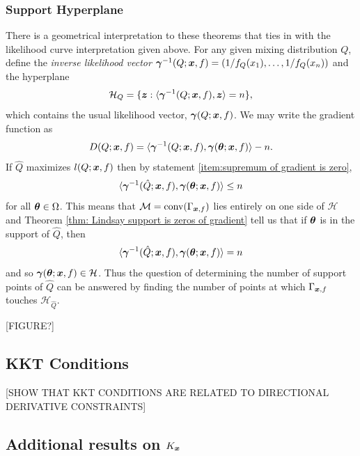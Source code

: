 	\subsubsection{Support Hyperplane}
	\label{sec: support hyperplane}
	There is a geometrical interpretation to these theorems that ties in with the likelihood curve interpretation given above. For any given mixing distribution $Q$, define the \emph{inverse likelihood vector} ${\bm{{\gamma}}}^{-1}(Q;{\bm{{x}}},f) = (1/f_Q(x_1),\dots, 1/f_Q(x_n))$ and the hyperplane
	\begin{equation}
		\mathcal{H}_{Q} = \{{\bm{{z}}} : \langle {\bm{{\gamma}}}^{-1}(Q;{\bm{{x}}},f), {\bm{{z}}}\rangle = n\},
	\end{equation}
	which contains the usual likelihood vector, ${\bm{{\gamma}}}(Q;{\bm{{x}}}, f)$. We may write the gradient function as
	\begin{equation}
		D(Q;{\bm{{x}}},f) = \langle {\bm{{\gamma}}}^{-1}(Q;{\bm{{x}}},f), {\bm{{\gamma}}}({\bm{{\theta}}};{\bm{{x}}},f)\rangle - n.
	\end{equation}
	If $\hat{Q}$ maximizes $l(Q;{\bm{{x}}},f)$ then by statement \ref{item:supremum of gradient is zero}, 
	\begin{equation}
		\langle {\bm{{\gamma}}}^{-1}(\hat{Q};{\bm{{x}}},f), {\bm{{\gamma}}}({\bm{{\theta}}};{\bm{{x}}},f) \rangle \leq n
	\end{equation}
	for all ${\bm{{\theta}}} \in \Omega$. This means that $\mathcal{M} = \mathrm{conv}(\Gamma_{{\bm{{x}}},f})$ lies entirely on one side of $\mathcal{H}$ and Theorem \ref{thm: Lindsay support is zeros of gradient} tell us that if ${\bm{{\theta}}}$ is in the support of $\hat{Q}$, then 
	\begin{equation}
		\langle {\bm{{\gamma}}}^{-1}(\hat{Q};{\bm{{x}}},f), {\bm{{\gamma}}}({\bm{{\theta}}};{\bm{{x}}},f) \rangle = n
	\end{equation}
	and so ${\bm{{\gamma}}}({\bm{{\theta}}};{\bm{{x}}},f) \in \mathcal{H}$. Thus the question of determining the number of support points of $\hat{Q}$ can be answered by finding the number of points at which $\Gamma_{{\bm{{x}}},f}$ touches $\mathcal{H}_{\hat{Q}}$.

	[FIGURE?]

	\subsection{KKT Conditions}

	[SHOW THAT KKT CONDITIONS ARE RELATED TO DIRECTIONAL DERIVATIVE CONSTRAINTS]

	\subsection{Additional results on \texorpdfstring{$K_{\bm{{x}}}$}{Kx}}

